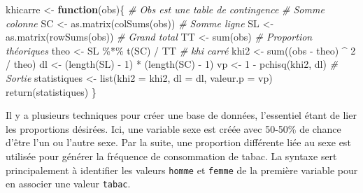 \documentclass[
]{book}
\newenvironment{Shaded}{}{}
\newcommand{\AttributeTok}[1]{#1}
\newcommand{\CommentTok}[1]{\textit{#1}}
\newcommand{\ControlFlowTok}[1]{\textbf{#1}}
\newcommand{\DecValTok}[1]{#1}
\newcommand{\FunctionTok}[1]{#1}
\newcommand{\NormalTok}[1]{#1}
\newcommand{\OtherTok}[1]{#1}
\newcommand{\SpecialCharTok}[1]{#1}
\begin{document}
\begin{Shaded}
\begin{Highlighting}[]
\NormalTok{khicarre }\OtherTok{\textless{}{-}} \ControlFlowTok{function}\NormalTok{(obs)\{}
  \CommentTok{\# Obs est une table de contingence}
  \CommentTok{\# Somme colonne}
\NormalTok{  SC }\OtherTok{\textless{}{-}} \FunctionTok{as.matrix}\NormalTok{(}\FunctionTok{colSums}\NormalTok{(obs))}
  \CommentTok{\# Somme ligne}
\NormalTok{  SL }\OtherTok{\textless{}{-}} \FunctionTok{as.matrix}\NormalTok{(}\FunctionTok{rowSums}\NormalTok{(obs))}
  \CommentTok{\# Grand total}
\NormalTok{  TT }\OtherTok{\textless{}{-}} \FunctionTok{sum}\NormalTok{(obs)}
  \CommentTok{\# Proportion théoriques}
\NormalTok{  theo }\OtherTok{\textless{}{-}}\NormalTok{ SL }\SpecialCharTok{\%*\%} \FunctionTok{t}\NormalTok{(SC) }\SpecialCharTok{/}\NormalTok{ TT}
  \CommentTok{\# khi carré}
\NormalTok{  khi2 }\OtherTok{\textless{}{-}} \FunctionTok{sum}\NormalTok{((obs }\SpecialCharTok{{-}}\NormalTok{ theo) }\SpecialCharTok{\^{}} \DecValTok{2} \SpecialCharTok{/}\NormalTok{ theo)}
\NormalTok{  dl }\OtherTok{\textless{}{-}}\NormalTok{ (}\FunctionTok{length}\NormalTok{(SL) }\SpecialCharTok{{-}} \DecValTok{1}\NormalTok{) }\SpecialCharTok{*}\NormalTok{ (}\FunctionTok{length}\NormalTok{(SC) }\SpecialCharTok{{-}} \DecValTok{1}\NormalTok{)}
\NormalTok{  vp }\OtherTok{\textless{}{-}} \DecValTok{1} \SpecialCharTok{{-}} \FunctionTok{pchisq}\NormalTok{(khi2, dl)}
  \CommentTok{\# Sortie}
\NormalTok{  statistiques }\OtherTok{\textless{}{-}} \FunctionTok{list}\NormalTok{(}\AttributeTok{khi2 =}\NormalTok{ khi2, }\AttributeTok{dl =}\NormalTok{ dl, }\AttributeTok{valeur.p =}\NormalTok{ vp)}
  \FunctionTok{return}\NormalTok{(statistiques)}
\NormalTok{\}}
\end{Highlighting}
\end{Shaded}

Il y a plusieurs techniques pour créer une base de données, l'essentiel étant de lier les proportions désirées. Ici, une variable sexe est créée avec 50-50\% de chance d'être l'un ou l'autre sexe. Par la suite, une proportion différente liée au sexe est utilisée pour générer la fréquence de consommation de tabac. La syntaxe sert principalement à identifier les valeurs \texttt{homme} et \texttt{femme} de la première variable pour en associer une valeur \texttt{tabac}.
\end{document}
